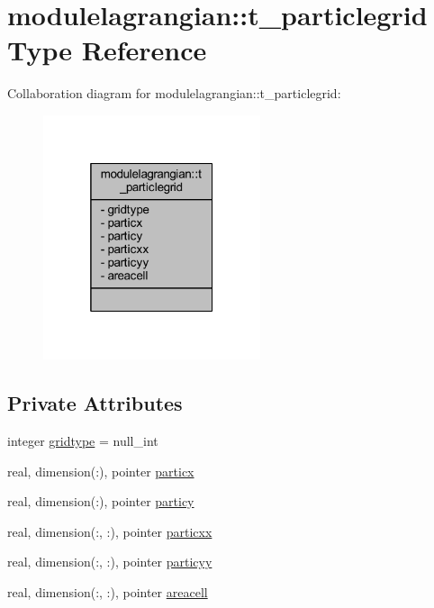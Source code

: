\hypertarget{structmodulelagrangian_1_1t__particlegrid}{}\section{modulelagrangian\+:\+:t\+\_\+particlegrid Type Reference}
\label{structmodulelagrangian_1_1t__particlegrid}


Collaboration diagram for modulelagrangian\+:\+:t\+\_\+particlegrid\+:\nopagebreak
\begin{figure}[H]
\begin{center}
\leavevmode
\includegraphics[width=181pt]{structmodulelagrangian_1_1t__particlegrid__coll__graph}
\end{center}
\end{figure}
\subsection*{Private Attributes}
\begin{DoxyCompactItemize}
\item 
integer \mbox{\hyperlink{structmodulelagrangian_1_1t__particlegrid_a6d3e66d7f989313c24e2019c49485295}{gridtype}} = null\+\_\+int
\item 
real, dimension(\+:), pointer \mbox{\hyperlink{structmodulelagrangian_1_1t__particlegrid_afe12f885854f56d0dbd22d03732da432}{particx}}
\item 
real, dimension(\+:), pointer \mbox{\hyperlink{structmodulelagrangian_1_1t__particlegrid_adf52e5492e3048ea4f06afe3c2225ce8}{particy}}
\item 
real, dimension(\+:, \+:), pointer \mbox{\hyperlink{structmodulelagrangian_1_1t__particlegrid_a0d010ab988635d0d55cb9b475e1a944f}{particxx}}
\item 
real, dimension(\+:, \+:), pointer \mbox{\hyperlink{structmodulelagrangian_1_1t__particlegrid_a6b5af538ed76ebb9f95417242747d6fd}{particyy}}
\item 
real, dimension(\+:, \+:), pointer \mbox{\hyperlink{structmodulelagrangian_1_1t__particlegrid_ab3d50044ccbab7bcd1c15231efd4703e}{areacell}}
\end{DoxyCompactItemize}


